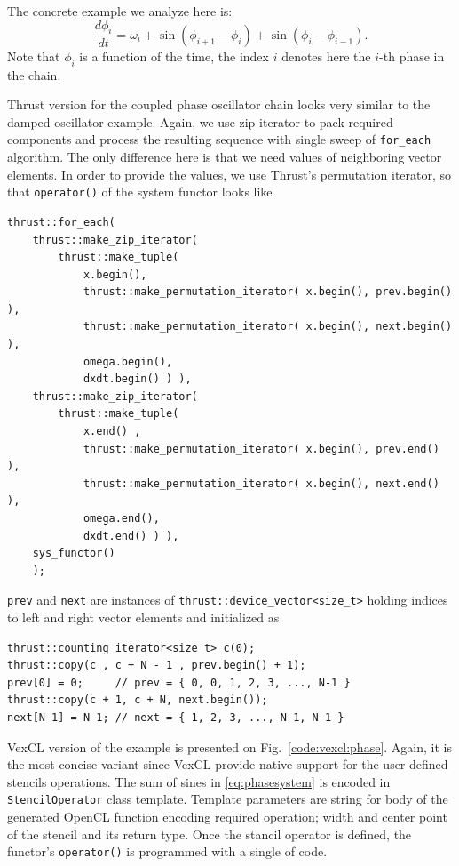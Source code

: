 \documentclass[1p]{elsarticle}
\newcommand{\code}[1]{\lstinline|#1|}
\newcommand{\figref}[1]{Fig.~\ref{#1}}
\begin{document}
The concrete example we analyze here is:
\begin{equation} \label{eq:phasesystem}
    \frac{d\phi_i}{dt} = \omega_i + \sin( \phi_{i+1} - \phi_i) + \sin( \phi_i
    - \phi_{i-1}).
\end{equation}
Note that $\phi_i$ is a function of the time, the index $i$ denotes here the
$i$-th phase in the chain.

Thrust version for the coupled phase oscillator chain looks very similar to the
damped oscillator example. Again, we use zip iterator to pack required
components and process the resulting sequence with single sweep of
\code{for_each} algorithm. The only difference here is that we need values of
neighboring vector elements. In order to provide the values, we use Thrust's
permutation iterator, so that \code{operator()} of the system functor looks
like
\begin{lstlisting}[frame=leftline]
thrust::for_each(
    thrust::make_zip_iterator(
        thrust::make_tuple(
            x.begin(),
            thrust::make_permutation_iterator( x.begin(), prev.begin() ),
            thrust::make_permutation_iterator( x.begin(), next.begin() ),
            omega.begin(),
            dxdt.begin() ) ),
    thrust::make_zip_iterator(
        thrust::make_tuple(
            x.end() ,
            thrust::make_permutation_iterator( x.begin(), prev.end() ),
            thrust::make_permutation_iterator( x.begin(), next.end() ),
            omega.end(),
            dxdt.end() ) ),
    sys_functor()
    );
\end{lstlisting}
\code{prev} and \code{next} are instances of
\code{thrust::device_vector<size_t>} holding indices to left and right vector
elements and initialized as
\begin{lstlisting}[frame=leftline]
thrust::counting_iterator<size_t> c(0);
thrust::copy(c , c + N - 1 , prev.begin() + 1);
prev[0] = 0;     // prev = { 0, 0, 1, 2, 3, ..., N-1 }
thrust::copy(c + 1, c + N, next.begin());
next[N-1] = N-1; // next = { 1, 2, 3, ..., N-1, N-1 }
\end{lstlisting}

VexCL version of the example is presented on \figref{code:vexcl:phase}. Again,
it is the most concise variant since VexCL provide native support for the
user-defined stencils operations. The sum of sines in \eqref{eq:phasesystem} is
encoded in \code{StencilOperator} class template. Template parameters are
string for body of the generated OpenCL function encoding required operation;
width and center point of the stencil and its return type. Once the stancil
operator is defined, the functor's \code{operator()} is programmed with a
single of code.
\end{document}
